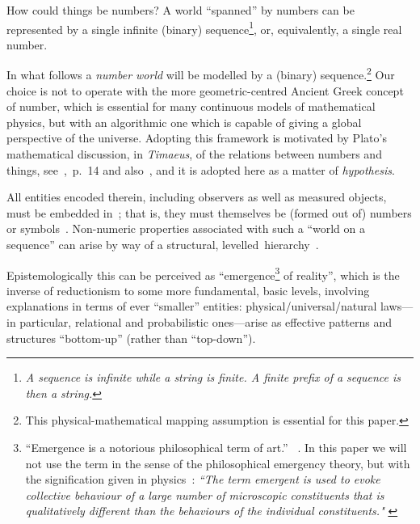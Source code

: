 \documentclass[12pt]{article}
\begin{document}
How could things be numbers? A  world ``spanned'' by numbers can be represented by a single infinite (binary)  sequence\footnote{\it A sequence is infinite while a string is finite. A finite prefix of a sequence is then a string.},
or, equivalently,  a single real number.

In what follows a {\em number world}
will be  modelled by a (binary) sequence.\footnote{This physical-mathematical mapping assumption
is essential for this paper.}
Our choice is  not to operate with the  more geometric-centred Ancient Greek concept of number,
which is essential for  many continuous models of mathematical physics,
but with an  algorithmic one which is capable of giving a global perspective of the universe.
Adopting this framework is motivated by
Plato's mathematical discussion, in {\em Timaeus},
of the relations between numbers and things, see~\cite{mg1968},~p.~14 and also~\cite{calude2013theeinai},
and it is adopted here as a matter of {\em hypothesis}.

All entities encoded therein, including observers as well as measured objects, must be embedded
in~\cite{toffoli:79,svozil-94};
that is, they must themselves be (formed out of) numbers  or symbols~\cite{borges-library}.
Non-numeric properties associated with such a ``world on a sequence''
can arise by way of a structural, levelled~hierarchy~\cite{anderson:73}.


Epistemologically this can be perceived as
``emergence\footnote{``Emergence is a notorious philosophical term of art.'' ~\cite{sep-properties-emergent}.  In this paper we will not use the term in the sense of the philosophical emergency theory, but with the signification given in physics~\cite{Kivelson-16}:  {\it ``The term emergent is used to evoke collective behaviour of a
large number of microscopic constituents that is qualitatively
different than the behaviours of the individual constituents." } } of reality'', which is the inverse
of reductionism to some more fundamental, basic levels, involving explanations in terms of ever ``smaller'' entities:
physical/universal/natural laws---in particular, relational and probabilistic ones---arise  as effective patterns
and structures ``bottom-up'' (rather than ``top-down'').
\end{document}
